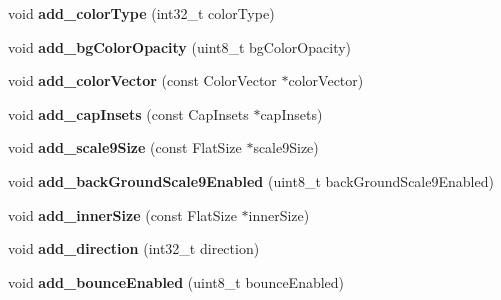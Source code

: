 \begin{DoxyCompactItemize}
void {\bfseries add\+\_\+color\+Type} (int32\+\_\+t color\+Type)
\item 
\mbox{\label{structflatbuffers_1_1ScrollViewOptionsBuilder_a723f3c4db45b74d75d9cabb6e9b210df}} 
void {\bfseries add\+\_\+bg\+Color\+Opacity} (uint8\+\_\+t bg\+Color\+Opacity)
\item 
\mbox{\label{structflatbuffers_1_1ScrollViewOptionsBuilder_a6d251ae134fafa3ff35477dc19e00bed}} 
void {\bfseries add\+\_\+color\+Vector} (const Color\+Vector $\ast$color\+Vector)
\item 
\mbox{\label{structflatbuffers_1_1ScrollViewOptionsBuilder_a20fc5ce3b240a443e1699dce5d5ca524}} 
void {\bfseries add\+\_\+cap\+Insets} (const Cap\+Insets $\ast$cap\+Insets)
\item 
\mbox{\label{structflatbuffers_1_1ScrollViewOptionsBuilder_ac11c417f639c6e3b12a16ea078926ff5}} 
void {\bfseries add\+\_\+scale9\+Size} (const Flat\+Size $\ast$scale9\+Size)
\item 
\mbox{\label{structflatbuffers_1_1ScrollViewOptionsBuilder_ad03ba96164fbaf0d83954e727a0b35e2}} 
void {\bfseries add\+\_\+back\+Ground\+Scale9\+Enabled} (uint8\+\_\+t back\+Ground\+Scale9\+Enabled)
\item 
\mbox{\label{structflatbuffers_1_1ScrollViewOptionsBuilder_a4741a0f2efe58ce88f52b60d57e4f3ca}} 
void {\bfseries add\+\_\+inner\+Size} (const Flat\+Size $\ast$inner\+Size)
\item 
\mbox{\label{structflatbuffers_1_1ScrollViewOptionsBuilder_a1a21909d83d8284d623328c19ecee826}} 
void {\bfseries add\+\_\+direction} (int32\+\_\+t direction)
\item 
\mbox{\label{structflatbuffers_1_1ScrollViewOptionsBuilder_a3366d28b5b03d8bf9a1b62505bbee4c7}} 
void {\bfseries add\+\_\+bounce\+Enabled} (uint8\+\_\+t bounce\+Enabled)
\item 

\end{DoxyCompactItemize}
